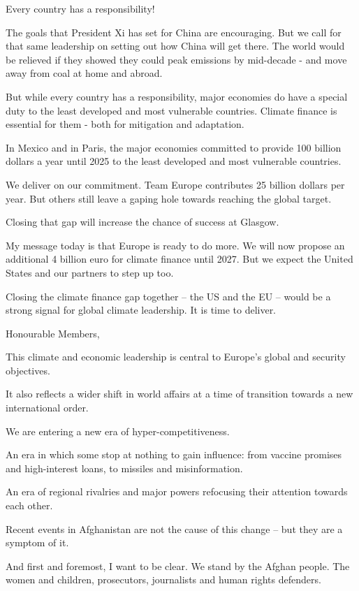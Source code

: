 \documentclass[a4paper,11pt]{article}
\begin{document}
Every country has a responsibility!

The goals that President Xi has set for China are encouraging. But we call for that same leadership on setting out how China will get there. The world would be relieved if they showed they could peak emissions by mid-decade - and move away from coal at home and abroad.

But while every country has a responsibility, major economies do have a special duty to the least developed and most vulnerable countries. Climate finance is essential for them - both for mitigation and adaptation.

In Mexico and in Paris, the major economies committed to provide 100 billion dollars a year until 2025 to the least developed and most vulnerable countries.

We deliver on our commitment. Team Europe contributes 25 billion dollars per year. But others still leave a gaping hole towards reaching the global target.

Closing that gap will increase the chance of success at Glasgow.

My message today is that Europe is ready to do more. We will now propose an additional 4 billion euro for climate finance until 2027. But we expect the United States and our partners to step up too.

Closing the climate finance gap together – the US and the EU – would be a strong signal for global climate leadership. It is time to deliver.

 

Honourable Members,

This climate and economic leadership is central to Europe's global and security objectives.

It also reflects a wider shift in world affairs at a time of transition towards a new international order.

We are entering a new era of hyper-competitiveness.

An era in which some stop at nothing to gain influence: from vaccine promises and high-interest loans, to missiles and misinformation.

An era of regional rivalries and major powers refocusing their attention towards each other.

Recent events in Afghanistan are not the cause of this change – but they are a symptom of it.

And first and foremost, I want to be clear. We stand by the Afghan people. The women and children, prosecutors, journalists and human rights defenders.
\end{document}
